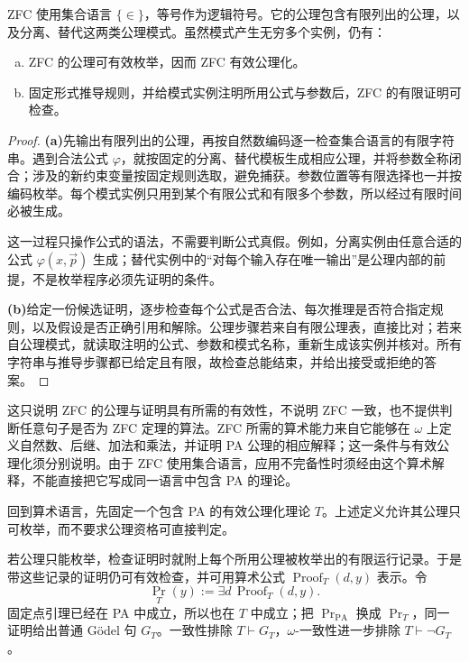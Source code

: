 \documentclass[lang=cn,a4paper,fontset=none,zihao=false,10pt,openany,twoside]{beautybook}
\numberwithin{algorithm}{chapter}
\begin{document}
\begin{example}
ZFC 使用集合语言 $\{\in\}$，等号作为逻辑符号。它的公理包含有限列出的公理，以及分离、替代这两类公理模式。虽然模式产生无穷多个实例，仍有：
\begin{enumerate}[(a)]
\item ZFC 的公理可有效枚举，因而 ZFC 有效公理化。
\item 固定形式推导规则，并给模式实例注明所用公式与参数后，ZFC 的有限证明可检查。
\end{enumerate}
\end{example}
\begin{proof}
\par\smallskip\noindent\textbf{(a)}\quad 先输出有限列出的公理，再按自然数编码逐一检查集合语言的有限字符串。遇到合法公式 $\varphi$，就按固定的分离、替代模板生成相应公理，并将参数全称闭合；涉及的新约束变量按固定规则选取，避免捕获。参数位置等有限选择也一并按编码枚举。每个模式实例只用到某个有限公式和有限多个参数，所以经过有限时间必被生成。

这一过程只操作公式的语法，不需要判断公式真假。例如，分离实例由任意合适的公式 $\varphi(x,\vec p)$ 生成；替代实例中的“对每个输入存在唯一输出”是公理内部的前提，不是枚举程序必须先证明的条件。

\par\smallskip\noindent\textbf{(b)}\quad 给定一份候选证明，逐步检查每个公式是否合法、每次推理是否符合指定规则，以及假设是否正确引用和解除。公理步骤若来自有限公理表，直接比对；若来自公理模式，就读取注明的公式、参数和模式名称，重新生成该实例并核对。所有字符串与推导步骤都已给定且有限，故检查总能结束，并给出接受或拒绝的答案。
\end{proof}
这只说明 ZFC 的公理与证明具有所需的有效性，不说明 ZFC 一致，也不提供判断任意句子是否为 ZFC 定理的算法。ZFC 所需的算术能力来自它能够在 $\omega$ 上定义自然数、后继、加法和乘法，并证明 PA 公理的相应解释；这一条件与有效公理化须分别说明。由于 ZFC 使用集合语言，应用不完备性时须经由这个算术解释，不能直接把它写成同一语言中包含 PA 的理论。

回到算术语言，先固定一个包含 PA 的有效公理化理论 $T$。上述定义允许其公理只可枚举，而不要求公理资格可直接判定。

若公理只能枚举，检查证明时就附上每个所用公理被枚举出的有限运行记录。于是带这些记录的证明仍可有效检查，并可用算术公式 $\operatorname{Proof}_T(d,y)$ 表示。令
\[
 \operatorname{Pr}_T(y):=\exists d\,\operatorname{Proof}_T(d,y).
\]
固定点引理已经在 PA 中成立，所以也在 $T$ 中成立；把 $\operatorname{Pr}_{\mathrm{PA}}$ 换成 $\operatorname{Pr}_T$，同一证明给出普通 Gödel 句 $G_T$。一致性排除 $T\vdash G_T$，$\omega$-一致性进一步排除 $T\vdash\neg G_T$。
\end{document}
